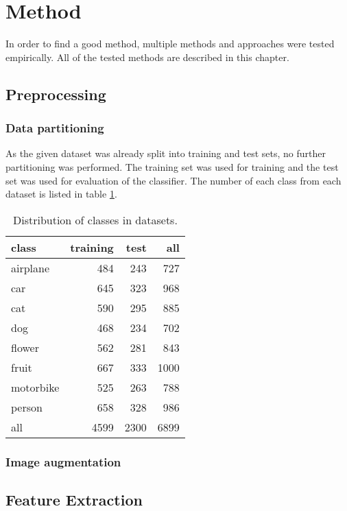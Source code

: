 \documentclass[doc/report.tex]{subfiles}
\begin{document}
\section{Method}
In order to find a good method, multiple methods and approaches were tested
empirically. All of the tested methods are described in this chapter.


\subsection{Preprocessing}

\subsubsection{Data partitioning}
As the given dataset was already split into training and test sets, no further
partitioning was performed. The training set was used for training and the test
set was used for evaluation of the classifier. The number of each class from
each dataset is listed in table \ref{tbl:datasets}.

\begin{table}[h]
    \centering
    \begin{tabular}{l|rr|r}
        class & training & test & all \\\hline
        airplane    & 484   & 243   & 727 \\
        car         & 645   & 323   & 968 \\
        cat         & 590   & 295   & 885 \\
        dog         & 468   & 234   & 702 \\
        flower      & 562   & 281   & 843 \\
        fruit       & 667   & 333   & 1000 \\
        motorbike   & 525   & 263   & 788 \\
        person      & 658   & 328   & 986 \\\hline
        all         & 4599  & 2300  & 6899
    \end{tabular}
    \caption{Distribution of classes in datasets.}
    \label{tbl:datasets}
\end{table}

\subsubsection{Image augmentation}


\subsection{Feature Extraction}
\end{document}
